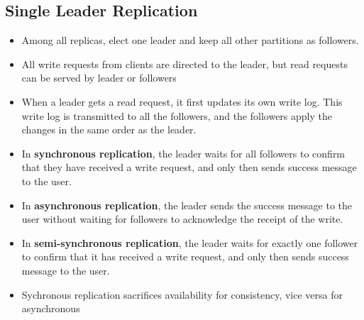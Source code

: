 \documentclass{article}
\begin{document}
\subsection{Single Leader Replication}
\begin{itemize}
    \item Among all replicas, elect one leader and keep all other partitions as followers.
    
    \item All write requests from clients are directed to the leader, but read requests can be served by leader or followers
    
    \item When a leader gets a read request, it first updates its own write log. This write log is transmitted to all the followers, and the followers apply the changes in the same order as the leader. 
    
    \item In \textbf{synchronous replication}, the leader waits for all followers to confirm that they have received a write request, and only then sends success message to the user. 
    
    \item In \textbf{asynchronous replication}, the leader sends the success message to the user without waiting for followers to acknowledge the receipt of the write. 
    
    \item In \textbf{semi-synchronous replication}, the leader waits for exactly one follower to confirm that it has received a write request, and only then sends success message to the user. 
    
    \item Sychronous replication sacrifices availability for consistency, vice versa for asynchronous
\end{itemize}
\end{document}
